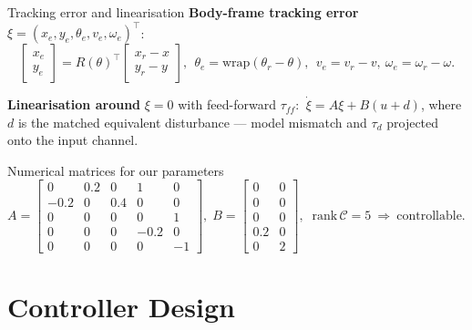 \documentclass[10pt,aspectratio=169]{beamer}
\begin{document}
\begin{frame}{Tracking error and linearisation}
  \textbf{Body-frame tracking error}
  $\xi=(x_e,y_e,\theta_e,v_e,\omega_e)^{\!\top}$:
  \[
    \begin{bmatrix}x_e\\y_e\end{bmatrix}
      = R(\theta)^{\!\top}\!\begin{bmatrix}x_r-x\\y_r-y\end{bmatrix},\ \
    \theta_e=\mathrm{wrap}(\theta_r-\theta),\ \
    v_e=v_r-v,\ \omega_e=\omega_r-\omega.
  \]

  \textbf{Linearisation around} $\xi=0$ with feed-forward $\tau_{ff}$:
  $\ \dot\xi = A\xi + B(u + d)$, where $d$ is the \alert{matched equivalent
  disturbance} — model mismatch and $\tau_d$ projected onto the input channel.

  \begin{block}{Numerical matrices for our parameters}
    \centering\footnotesize
    \setlength{\arraycolsep}{3pt}\renewcommand{\arraystretch}{0.95}
    $A=\!\begin{bmatrix}
       0 & 0.2 & 0 & 1 & 0\\
       -0.2 & 0 & 0.4 & 0 & 0\\
       0 & 0 & 0 & 0 & 1\\
       0 & 0 & 0 & -0.2 & 0\\
       0 & 0 & 0 & 0 & -1
    \end{bmatrix}\!,\;
    B=\!\begin{bmatrix}
       0 & 0\\0 & 0\\0 & 0\\0.2 & 0\\0 & 2
    \end{bmatrix},\;\;
    \mathrm{rank}\,\mathcal{C}=5\ \Rightarrow\ \text{controllable.}$
  \end{block}
\end{frame}

\section{Controller Design}
\end{document}
